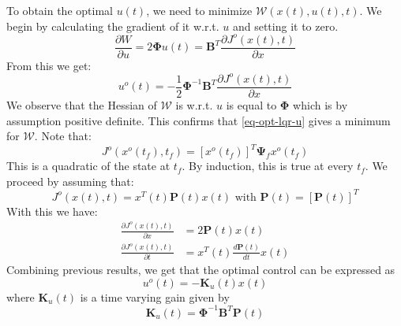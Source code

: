 \documentclass{book}
\begin{document}
To obtain the optimal $ u (t)  $, we need to minimize
$ \mathcal{W} (x (t), u (t), t)  $.
We begin by calculating the gradient of it w.r.t. $ u  $ and setting it to zero.
\begin{equation}
\frac{\partial W}{\partial u} = 
2 \bm{\Phi} u (t) = \bm{B}^{ T } \frac{\partial J^{ o } (x (t), t)}{\partial x} 
\end{equation}
From this we get:
\begin{equation}
		\label{eq-opt-lqr-u}
		u^{ o} (t) = - \frac{1}{2} \bm{\Phi}^{ -1 }\bm{B}^{ T } \frac{\partial J^{ o } (x (t), t)}{\partial x} 
\end{equation}
We observe that the Hessian of $ \mathcal{W}  $ is w.r.t. $ u  $ is equal to
$ \bm{\Phi}  $ which is by assumption positive definite.
This confirms that \ref{eq-opt-lqr-u} gives a minimum for $ \mathcal{W}  $.
Note that:
\begin{equation}
J ^{ o } (x^{ o } (t_{ f }), t_{ f }) = \left[ x^{ o } (t_{ f }) \right] ^{ T }
\bm{\Psi}_{ f } x^{ o } (t_{ f })
\end{equation}
This is a quadratic of the state at $ t_{ f }  $.
By induction, this is true at every $ t_{ f }  $.
We proceed by assuming that:
\begin{equation}
J^{ o } (x (t), t) = x^{ T } (t) \bm{P} (t) x (t) \text{ with } \bm{P} (t) = \left[ \bm{P} (t) \right] ^{ T }
\end{equation}
With this we have:
\begin{align}
		\frac{\partial J^{ o } (x (t), t)}{\partial x}  &= 2 \bm{P} (t) x (t)\\
		\frac{\partial J^{ o } (x (t), t)}{\partial t}  &= x^{ T } (t) \frac{d \bm{P} (t) }{dt}  x (t)
\end{align}
Combining previous results, we get that the optimal control can be expressed as
\begin{equation}
u^{ o } (t) = - \bm{K}_{ u } (t) x (t)
\end{equation}
where $ \bm{K}_{ u } (t)  $ is a time varying gain given by
\begin{equation}
\bm{K}_{ u } (t) = \bm{\Phi}^{ -1 } \bm{B}^{ T } \bm{P} (t)
\end{equation}
\end{document}
